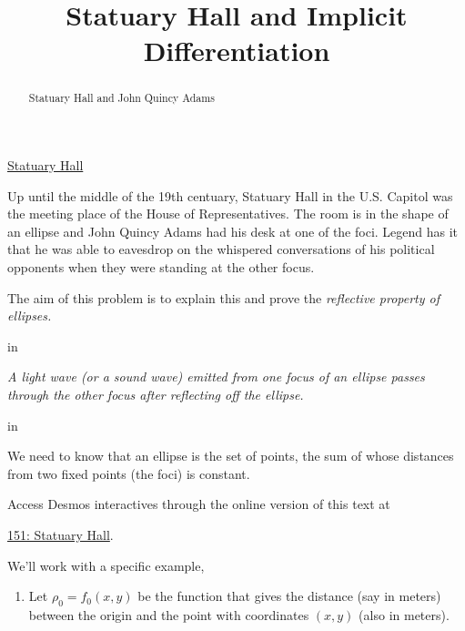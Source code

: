 \documentclass{ximera}
\title{Statuary Hall and Implicit Differentiation}
\newcommand{\pskip}{\vskip 0.1 in}
\begin{document}
\begin{abstract}
Statuary Hall and John Quincy Adams
\end{abstract}
\maketitle


\begin{question}  \label{Q656g5y4546}

\begin{center}
\end{center}

\href{https://www.youtube.com/watch?v=FX6rUU_74kk}{Statuary Hall}


Up until the middle of the 19th centuary, Statuary Hall in the U.S. Capitol was the meeting place of the House of Representatives. The room is in the shape of an ellipse and John Quincy Adams had his desk at one of the foci. Legend has it that he was able to eavesdrop on the whispered conversations of his political opponents when they were standing at the other focus.

The aim of this problem is to explain this and prove the \emph{reflective property of ellipses.}

\pskip

\emph{A light wave (or a sound wave) emitted from one focus of an ellipse passes through the other focus after reflecting off the ellipse.}

\pskip

We need to know that an ellipse is the set of points, the sum of whose distances from two fixed points (the foci) is constant. 

\begin{onlineOnly}
    \begin{center}
\end{center}
\end{onlineOnly}

Access Desmos interactives through the online version of this text at
 
\href{https://https://www.desmos.com/calculator/6kxtojk72r}{151: Statuary Hall}.

We'll work with a specific example, 

\begin{enumerate}
\item Let $\rho_0 = f_0(x,y)$ be the function that gives the distance (say in meters) between the origin and the point with coordinates $(x,y)$ (also in meters).


\end{enumerate}
\end{question}
\end{document}
